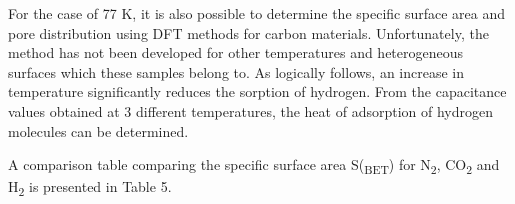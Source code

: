 \begin{multicols}{2}
For the case of 77 K, it is also possible to determine the specific
surface area and pore distribution using DFT methods for carbon
materials. Unfortunately, the method has not been developed for other
temperatures and heterogeneous surfaces which these samples belong to.
As logically follows, an increase in temperature significantly reduces
the sorption of hydrogen. From the capacitance values
\hspace{0pt}\hspace{0pt}obtained at 3 different temperatures, the heat
of adsorption of hydrogen molecules can be determined.

A comparison table comparing the specific surface area
S(\textsubscript{BET}) for N\textsubscript{2}, CO\textsubscript{2} and
H\textsubscript{2} is presented in Table 5.
\end{multicols}


